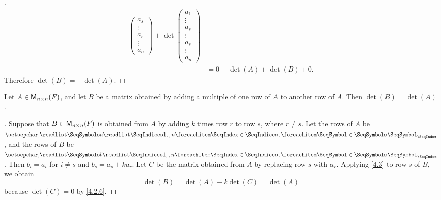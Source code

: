 \begin{proof}[]
\begin{align*}
\begin{pmatrix}
			                                                  a_s    \\
			                                                  \vdots \\
			                                                  a_r    \\
			                                                  \vdots \\
			                                                  a_n
		                                                  \end{pmatrix} + \det\begin{pmatrix}
			                                                                      a_1    \\
			                                                                      \vdots \\
			                                                                      a_s    \\
			                                                                      \vdots \\
			                                                                      a_s    \\
			                                                                      \vdots \\
			                                                                      a_n
		                                                                      \end{pmatrix} \\
		  & = 0 + \det(A) + \det(B) + 0.
	\end{align*}
	Therefore \(\det(B) = -\det(A)\).
\end{proof}

\begin{thm}\label{4.6}
	Let \(A \in \ms[n][n][\F]\), and let \(B\) be a matrix obtained by adding a multiple of one row of \(A\) to another row of \(A\).
	Then \(\det(B) = \det(A)\).
\end{thm}

\begin{proof}[]
	Suppose that \(B \in \ms[n][n][\F]\) is obtained from \(A\) by adding \(k\) times row \(r\) to row \(s\), where \(r \neq s\).
	Let the rows of \(A\) be \(\seq{a}{1,,n}\), and the rows of \(B\) be \(\seq{b}{1,,n}\).
	Then \(b_i = a_i\) for \(i \neq s\) and \(b_s = a_s + k a_r\).
	Let \(C\) be the matrix obtained from \(A\) by replacing row \(s\) with \(a_r\).
	Applying \cref{4.3} to row \(s\) of \(B\), we obtain
	\[
		\det(B) = \det(A) + k \det(C) = \det(A)
	\]
	because \(\det(C) = 0\) by \cref{4.2.6}.
\end{proof}

